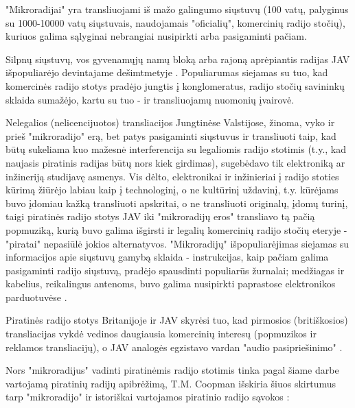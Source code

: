\documentclass[kursinis-darbas]{vukf}
\begin{document}
"Mikroradijai" yra transliuojami iš mažo galingumo siųstuvų (100 vatų, palyginus su 1000-10000 vatų siųstuvais, naudojamais "oficialių", komercinių radijo stočių), kuriuos galima sąlyginai nebrangiai nusipirkti arba pasigaminti pačiam.

Silpnų siųstuvų, vos gyvenamųjų namų bloką arba rajoną aprėpiantis radijas JAV išpopuliarėjo devintajame dešimtmetyje \cite[p.~2]{tmc_fcc_enforcement_difficulties_with_unlicensed_micro_radio}. Populiarumas siejamas su tuo, kad komercinės radijo stotys pradėjo jungtis į konglomeratus, radijo stočių savininkų sklaida sumažėjo, kartu su tuo - ir transliuojamų nuomonių įvairovė.

Nelegalios (nelicencijuotos) transliacijos Jungtinėse Valstijose, žinoma, vyko ir prieš "mikroradijo" erą, bet patys pasigaminti siųstuvus ir transliuoti taip, kad būtų sukeliama kuo mažesnė interferencija su legaliomis radijo stotimis (t.y., kad naujasis piratinis radijas būtų nors kiek girdimas), sugebėdavo tik elektroniką ar inžineriją studijavę asmenys. Vis dėlto, elektronikai ir inžinieriai į radijo stoties kūrimą žiūrėjo labiau kaip į technologinį, o ne kultūrinį uždavinį, t.y. kūrėjams buvo įdomiau kažką transliuoti apskritai, o ne transliuoti originalų, įdomų turinį, taigi piratinės radijo stotys JAV iki "mikroradijų eros" transliavo tą pačią popmuziką, kurią buvo galima išgirsti ir legalių komercinių radijo stočių eteryje - "piratai" nepasiūlė jokios alternatyvos. "Mikroradijų" išpopuliarėjimas siejamas su informacijos apie siųstuvų gamybą sklaida - instrukcijas, kaip pačiam galima pasigaminti radijo siųstuvą, pradėjo spausdinti populiarūs žurnalai; medžiagas ir kabelius, reikalingus antenoms, buvo galima nusipirkti paprastose elektronikos parduotuvėse \cite[p.~37]{ay_low_power_fm_transmitters_electronics_now}.

Piratinės radijo stotys Britanijoje ir JAV skyrėsi tuo, kad pirmosios (britiškosios) transliacijas vykdė vedinos daugiausia komercinių interesų (popmuzikos ir reklamos transliacijų), o JAV analogės egzistavo vardan "audio pasipriešinimo" \cite[p.~135]{hc_key_concepts_in_radio_studies}.

Nors "mikroradijus" vadinti piratinėmis radijo stotimis tinka pagal šiame darbe vartojamą piratinių radijų apibrėžimą, T.M. Coopman išskiria šiuos skirtumus tarp "mikroradijo" ir istoriškai vartojamos piratinio radijo sąvokos \cite[p.~3]{tmc_fcc_enforcement_difficulties_with_unlicensed_micro_radio}:
\end{document}
